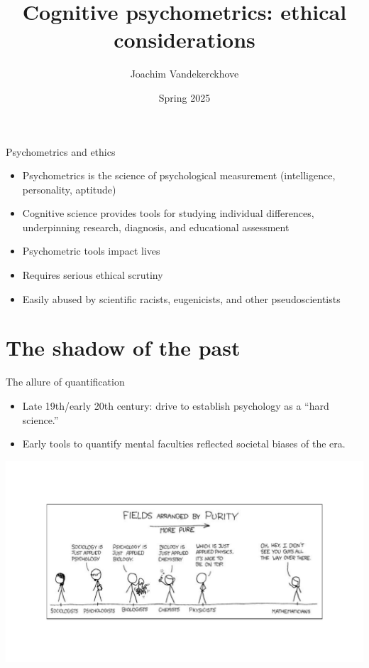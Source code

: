 \documentclass[aspectratio=169]{beamer}
\title{Cognitive psychometrics: ethical considerations}
\author{Joachim Vandekerckhove}
\date{Spring 2025}
\begin{document}
\maketitle

\begin{frame}{Psychometrics and ethics}
  \begin{itemize}
    \item Psychometrics is the science of psychological measurement (intelligence, personality, aptitude)\pause
    \item Cognitive science provides tools for studying individual differences, underpinning research, diagnosis, and educational assessment\pause
    \item Psychometric tools impact lives\pause
    \item Requires serious ethical scrutiny\pause
    \item Easily abused by scientific racists, eugenicists, and other pseudoscientists
  \end{itemize}
\end{frame}


\section{The shadow of the past}

\begin{frame}{The allure of quantification}
  \begin{itemize}
    \item Late 19th/early 20th century: drive to establish psychology as a ``hard science.''\pause
    \item Early tools to quantify mental faculties reflected societal biases of the era.\pause
  \end{itemize}
  \includegraphics[width=\textwidth,clip,trim=0 50pt 0 70pt]{../figures/purity-full.pdf}
\end{frame}
\end{document}
